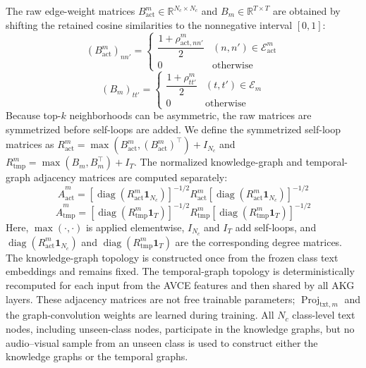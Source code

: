 \documentclass[lettersize,journal]{IEEEtran}
\begin{document}
The raw edge-weight matrices $B_{\mathrm{act}}^m\in\mathbb{R}^{N_c\times N_c}$ and $B_m\in\mathbb{R}^{T\times T}$ are obtained by shifting the retained cosine similarities to the nonnegative interval $[0,1]$:
\begin{equation}
\left(B_{\mathrm{act}}^m\right)_{nn'}=
\begin{cases}
\dfrac{1+\rho_{\mathrm{act},nn'}^m}{2} & (n,n')\in\mathcal{E}_{\mathrm{act}}^m\\
0 & \text{otherwise}
\end{cases}
\end{equation}
\begin{equation}
\left(B_m\right)_{tt'}=
\begin{cases}
\dfrac{1+\rho_{tt'}^m}{2} & (t,t')\in\mathcal{E}_m\\
0 & \text{otherwise}
\end{cases}
\end{equation}
Because top-$k$ neighborhoods can be asymmetric, the raw matrices are symmetrized before self-loops are added. We define the symmetrized self-loop matrices as $R_{\mathrm{act}}^m=\max(B_{\mathrm{act}}^m,(B_{\mathrm{act}}^m)^{\top})+I_{N_c}$ and $R_{\mathrm{tmp}}^m=\max(B_m,B_m^{\top})+I_T$. The normalized knowledge-graph and temporal-graph adjacency matrices are computed separately:
\begin{equation}
\widehat A_{\mathrm{act}}^m = \left[\operatorname{diag}\left(R_{\mathrm{act}}^m\mathbf{1}_{N_c}\right)\right]^{-1/2}
R_{\mathrm{act}}^m
\left[\operatorname{diag}\left(R_{\mathrm{act}}^m\mathbf{1}_{N_c}\right)\right]^{-1/2}
\end{equation}
\begin{equation}
\widehat A_{\mathrm{tmp}}^m = \left[\operatorname{diag}\left(R_{\mathrm{tmp}}^m\mathbf{1}_{T}\right)\right]^{-1/2}
R_{\mathrm{tmp}}^m
\left[\operatorname{diag}\left(R_{\mathrm{tmp}}^m\mathbf{1}_{T}\right)\right]^{-1/2}
\end{equation}
Here, $\max(\cdot,\cdot)$ is applied elementwise, $I_{N_c}$ and $I_T$ add self-loops, and $\operatorname{diag}(R_{\mathrm{act}}^m\mathbf{1}_{N_c})$ and $\operatorname{diag}(R_{\mathrm{tmp}}^m\mathbf{1}_T)$ are the corresponding degree matrices. The knowledge-graph topology is constructed once from the frozen class text embeddings and remains fixed. The temporal-graph topology is deterministically recomputed for each input from the AVCE features and then shared by all AKG layers. These adjacency matrices are not free trainable parameters; $\operatorname{Proj}_{\mathrm{txt},m}$ and the graph-convolution weights are learned during training. All $N_c$ class-level text nodes, including unseen-class nodes, participate in the knowledge graphs, but no audio--visual sample from an unseen class is used to construct either the knowledge graphs or the temporal graphs.
\end{document}
